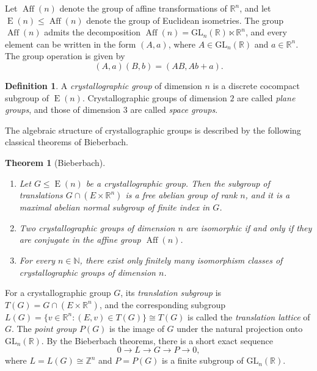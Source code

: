 \documentclass[draft]{adm-paper}
\newtheorem{theorem}{Theorem}
\theoremstyle{definition}
\newtheorem{definition}{Definition}
\begin{document}
Let $\operatorname{Aff}(n)$ denote the group of affine transformations of $\mathbb{R}^n$, and let $\operatorname{E}(n)
\le \operatorname{Aff}(n)$ denote the group of Euclidean isometries. The group $\operatorname{Aff}(n)$ admits the decomposition
$\operatorname{Aff}(n)=\mathrm{GL}_n(\mathbb{R})\ltimes \mathbb{R}^n$, and every element can be written in the form $(A,a)$,
where $A\in \mathrm{GL}_n(\mathbb{R})$ and $a\in\mathbb{R}^n$. The group operation is given by
\[
(A,a)(B,b)=(AB,Ab+a).
\]

\begin{definition}
A \emph{crystallographic group} of dimension $n$ is a discrete cocompact subgroup of $\operatorname{E}(n)$.
Crystallographic groups of dimension $2$ are called \emph{plane groups}, and those of dimension $3$ are called \emph{space groups}.
\end{definition}

The algebraic structure of crystallographic groups is described by the following classical theorems of Bieberbach.

\begin{theorem}[Bieberbach]
\begin{enumerate}
  \item Let $G\le\operatorname{E}(n)$ be a crystallographic gro\-up. Then the subgroup of translations
  $G \cap (E \times \mathbb{R}^n)$ is a free abelian group of rank $n$, and it
  is a maximal abelian normal subgroup of finite index in $G$.

  \item Two crystallographic groups of dimension $n$ are isomorphic if and only if they are conjugate
  in the affine group $\operatorname{Aff}(n)$.

  \item For every $n\in\mathbb{N}$, there exist only finitely many isomorphism classes of crystallographic groups of dimension $n$.
\end{enumerate}
\end{theorem}

For a crystallographic group $G$, its \emph{translation subgroup} is $T(G)=G \cap (E \times \mathbb{R}^n)$, and the
corresponding subgroup $L(G)=\{v\in\mathbb{R}^n : (E,v)\in T(G)\}\cong T(G)$ is called the \emph{translation lattice}
of $G$. The \emph{point group} $P(G)$ is the image of $G$ under the natural projection onto $\mathrm{GL}_n(\mathbb{R})$.
By the Bieberbach theorems, there is a short exact sequence
\[
0 \rightarrow L \rightarrow G \rightarrow P \rightarrow 0,
\]
where $L=L(G)\cong\mathbb{Z}^n$ and $P=P(G)$ is a finite subgroup of $\mathrm{GL}_n(\mathbb{R})$.
\end{document}
